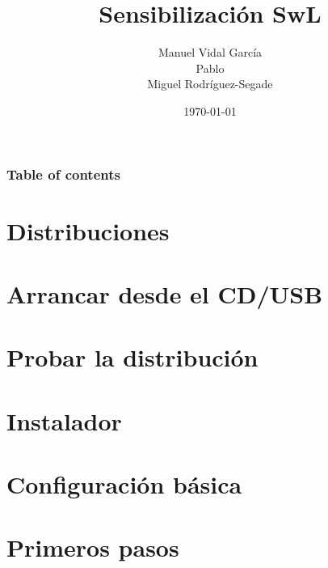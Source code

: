\documentclass{beamer}
\title{Sensibilización SwL}
\author{Manuel Vidal García\\ Pablo \\ Miguel Rodríguez-Segade}
\date{\today}
\begin{document}
\begin{frame}
    \titlepage
\end{frame}

\begin{frame} \frametitle{Table of contents}
    \tableofcontents
\end{frame}

\section{Distribuciones}


\section{Arrancar desde el CD/USB}

\section{Probar la distribución}

\section{Instalador}

\section{Configuración básica}

\section{Primeros pasos}
\end{document}

